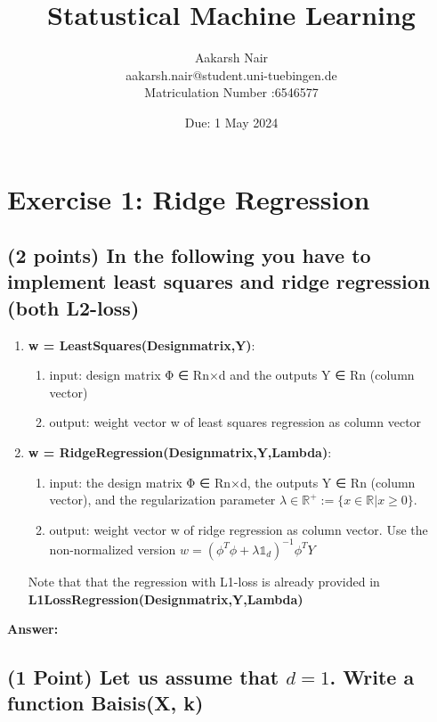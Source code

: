 \documentclass{./tufte-handout}
\title{Statustical Machine Learning}
\author[Aakarsh Nair]{Aakarsh Nair\\aakarsh.nair@student.uni-tuebingen.de  \\Matriculation Number :6546577 }
\date{Due: 1 May 2024}
\begin{document}
\maketitle

\section{Exercise 1: Ridge Regression}

\subsection{(2 points) In the following you have to implement least squares and ridge regression (both L2-loss)}

\begin{enumerate}
    \item \textbf{w = LeastSquares(Designmatrix,Y)}:
    \begin{enumerate}
    \item  input: design matrix Φ ∈ Rn×d and the outputs Y ∈ Rn (column vector)
    \item output: weight vector w of least squares regression as column vector
    \end{enumerate}
    \item  \textbf{w = RidgeRegression(Designmatrix,Y,Lambda)}:
    \begin{enumerate}
        \item input: the design matrix Φ ∈ Rn×d, the outputs Y ∈ Rn (column vector), and the regularization
        parameter $\lambda \in \mathbb{R}^+ := \{x \in \mathbb{R}|x \geq 0\}$.
        \item output: weight vector w of ridge regression as column vector. Use the non-normalized version
        $w = (\phi^T \phi + \lambda \mathbb{1}_d)^{−1}\phi^T Y$ 
    \end{enumerate}
    
    Note that that the regression with L1-loss is already provided in 
        \textbf{L1LossRegression(Designmatrix,Y,Lambda)}
\end{enumerate}

\textbf{Answer:}
\subsection{(1 Point) Let us assume that $d =1$. Write a function Baisis(X, k) }


\end{document}
